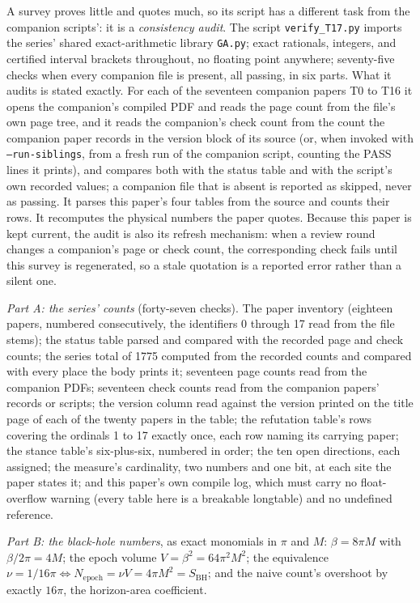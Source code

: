 \documentclass[11pt]{article}
\theoremstyle{definition}
\begin{document}
A survey proves little and quotes much, so its script has a different task from the companion scripts': it is a \emph{consistency audit}. The script \texttt{verify\_T17.py} \cite{ButlerVerifyT17} imports the series' shared exact-arithmetic library \texttt{GA.py}; exact rationals, integers, and certified interval brackets throughout, no floating point anywhere; seventy-five checks when every companion file is present, all passing, in six parts. What it audits is stated exactly. For each of the seventeen companion papers T0 to T16 it opens the companion's compiled PDF and reads the page count from the file's own page tree, and it reads the companion's check count from the count the companion paper records in the version block of its source (or, when invoked with \texttt{--run-siblings}, from a fresh run of the companion script, counting the PASS lines it prints), and compares both with the status table and with the script's own recorded values; a companion file that is absent is reported as skipped, never as passing. It parses this paper's four tables from the source and counts their rows. It recomputes the physical numbers the paper quotes. Because this paper is kept current, the audit is also its refresh mechanism: when a review round changes a companion's page or check count, the corresponding check fails until this survey is regenerated, so a stale quotation is a reported error rather than a silent one.

\emph{Part A: the series' counts} (forty-seven checks). The paper inventory (eighteen papers, numbered consecutively, the identifiers 0 through 17 read from the file stems); the status table parsed and compared with the recorded page and check counts; the series total of 1775 computed from the recorded counts and compared with every place the body prints it; seventeen page counts read from the companion PDFs; seventeen check counts read from the companion papers' records or scripts; the version column read against the version printed on the title page of each of the twenty papers in the table; the refutation table's rows covering the ordinals 1 to 17 exactly once, each row naming its carrying paper; the stance table's six-plus-six, numbered in order; the ten open directions, each assigned; the measure's cardinality, two numbers and one bit, at each site the paper states it; and this paper's own compile log, which must carry no float-overflow warning (every table here is a breakable longtable) and no undefined reference.

\emph{Part B: the black-hole numbers}, as exact monomials in $\pi$ and $M$: $\beta = 8\pi M$ with $\beta/2\pi = 4M$; the epoch volume $V = \beta^{2} = 64\pi^{2}M^{2}$; the equivalence $\nu = 1/16\pi \iff N_{\mathrm{epoch}} = \nu V = 4\pi M^{2} = S_{\mathrm{BH}}$; and the naive count's overshoot by exactly $16\pi$, the horizon-area coefficient.
\end{document}
